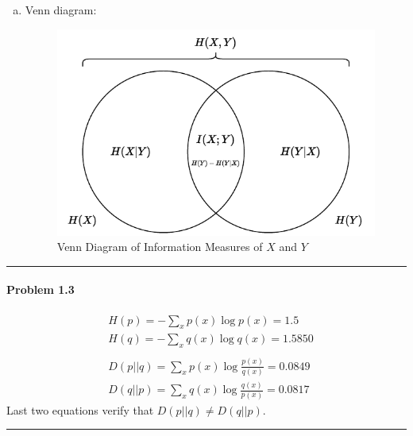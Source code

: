 \documentclass[12pt, letterpaper]{scrartcl}
\begin{document}
\begin{enumerate}[a.]
    \item Venn diagram:
    \begin{figure}[H]
    \includegraphics[width=0.6\linewidth]{hw1_figures/venn.pdf}
    \centering
    \caption{Venn Diagram of Information Measures of $X$ and $Y$}
    \end{figure}
\end{enumerate}
\hrule

\paragraph*{Problem 1.3} \hfill
\begin{align*}
    &H(p)=-\sum_{x} p(x)\log p(x)=1.5\\
    &H(q)=-\sum_{x} q(x)\log q(x)=1.5850\\\\
    &D(p||q)=\sum_{x} p(x)\log\frac{p(x)}{q(x)}=0.0849\\
    &D(q||p)=\sum_{x} q(x)\log\frac{q(x)}{p(x)}=0.0817
\end{align*}
Last two equations verify that $D(p||q)\neq D(q||p)$.
\newline\hrule
\end{document}
